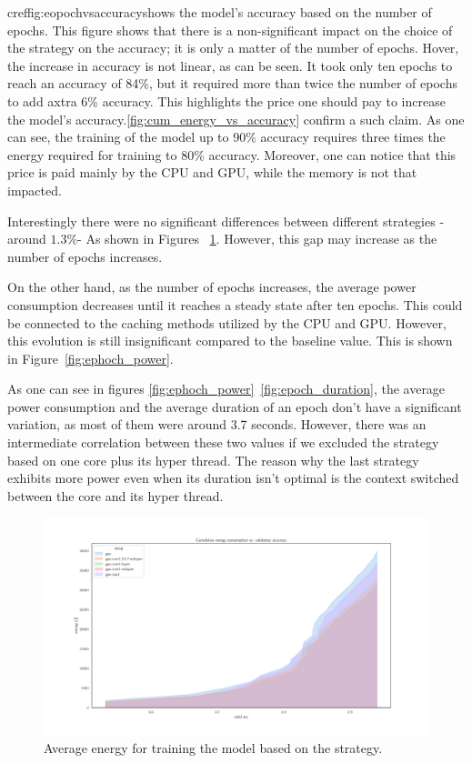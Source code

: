 cref{fig:eopochvsaccuracy}shows the model's accuracy based on the number of epochs. This figure shows that there is a non-significant impact on the choice of the strategy on the accuracy; it is only a matter of the number of epochs. Hover, the increase in accuracy is not linear, as can be seen. It took only ten epochs to reach an accuracy of 84\%, but it required more than twice the number of epochs to add axtra 6\% accuracy. This highlights the price one should pay to increase the model's accuracy.\cref{fig:cum_energy_vs_accuracy} confirm a such claim.
As one can see, the training of the model up to 90\% accuracy requires three times the energy required for training to 80\% accuracy. Moreover, one can notice that this price is paid mainly by the CPU and GPU, while the memory is not that impacted.

Interestingly there were no significant differences between different strategies -around $1.3\%$- As shown in Figures ~\ref{fig:av_energy_setup}. However, this gap may increase as the number of epochs increases.

On the other hand, as the number of epochs increases, the average power consumption decreases until it reaches a steady state after ten epochs. This could be connected to the caching methods utilized by the CPU and GPU. However, this evolution is still insignificant compared to the baseline value. This is shown in Figure~\ref{fig:ephoch_power}.

As one can see in figures \ref{fig:ephoch_power}~\ref{fig:epoch_duration}, the average power consumption and the average duration of an epoch don't have a significant variation, as most of them were around 3.7 seconds. However, there was an intermediate correlation between these two values if we excluded the strategy based on one core plus its hyper thread. The reason why the last strategy exhibits more power even when its duration isn't optimal is the context switched between the core and its hyper thread.



\begin{figure}
    \centering
    \includegraphics[width=\linewidth]{imgs/cumulative_energy_fast10.pdf}
    \caption{Average energy for training the model based on the strategy.}
    \label{fig:av_energy_setup}
\end{figure}


